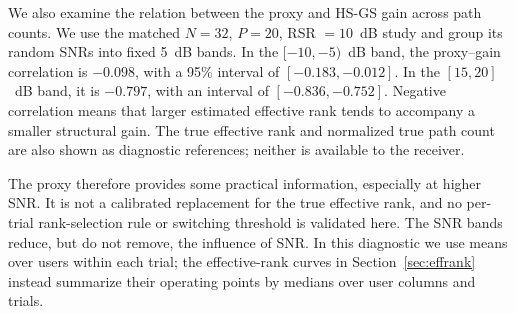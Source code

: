 \documentclass[journal]{IEEEtran}
\begin{document}
We also examine the relation between the proxy and HS-GS gain across
path counts. We use the matched $N=32$, $P=20$, RSR $=10$~dB study and
group its random SNRs into fixed 5~dB bands. In the $[-10,-5)$~dB band,
the proxy--gain correlation is $-0.098$, with a 95\% interval of
$[-0.183,-0.012]$. In the $[15,20]$~dB band, it is $-0.797$, with an
interval of $[-0.836,-0.752]$. Negative correlation means that larger
estimated effective rank tends to accompany a smaller structural gain.
The true effective rank and normalized true path count are also shown
as diagnostic references; neither is available to the receiver.

The proxy therefore provides some practical information, especially at
higher SNR. It is not a calibrated replacement for the true effective
rank, and no per-trial rank-selection rule or switching threshold is
validated here. The SNR bands reduce, but do not remove, the influence
of SNR. In this diagnostic we use means over users within each trial;
the effective-rank curves in Section~\ref{sec:effrank} instead summarize their operating
points by medians over user columns and trials.
\end{document}
